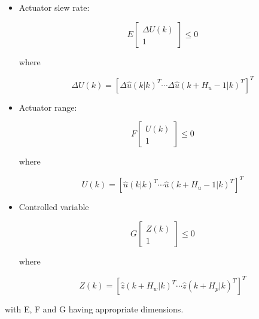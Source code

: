 \begin{itemize}
	\item Actuator slew rate:

	\begin{equation} \label{eq:mpc_const_sr}
		E \begin{bmatrix} \Delta U(k) \\ 1 \end{bmatrix} \le 0
	\end{equation}
	\begin{center} where \end{center}
	\begin{equation*}
		\Delta U(k) = [\Delta \hat{u}(k|k)^T \cdots \Delta \hat{u}(k+H_u-1|k)^T]^T
	\end{equation*}


	\item Actuator range:

	\begin{equation} \label{eq:mpc_const_ar}
		F \begin{bmatrix} U(k) \\ 1 \end{bmatrix} \le 0
	\end{equation}
	\begin{center} where \end{center}
	\begin{equation*}
		U(k) = [\hat{u}(k|k)^T \cdots \hat{u}(k+H_u-1|k)^T]^T
	\end{equation*}

	\item Controlled variable

	\begin{equation} \label{eq:mpc_const_cv}
		G \begin{bmatrix} Z(k) \\ 1 \end{bmatrix} \le 0
	\end{equation}
	\begin{center} where \end{center}
	\begin{equation*}
		Z(k) = [\hat{z}(k+H_w|k)^T \cdots \hat{z}(k+H_p|k)^T]^T
	\end{equation*}
\end{itemize}

\noindent with E, F and G having appropriate dimensions.







